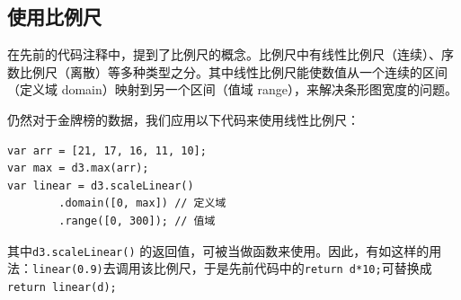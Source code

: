 \subsection{使用比例尺}

在先前的代码注释中，提到了比例尺的概念。比例尺中有线性比例尺（连续）、序数比例尺（离散）等多种类型之分。其中线性比例尺能使数值从一个连续的区间（定义域 domain）映射到另一个区间（值域 range），来解决条形图宽度的问题。

仍然对于金牌榜的数据，我们应用以下代码来使用线性比例尺：

\begin{verbatim}
var arr = [21, 17, 16, 11, 10];
var max = d3.max(arr);
var linear = d3.scaleLinear()
        .domain([0, max]) // 定义域
        .range([0, 300]); // 值域
\end{verbatim}

其中\verb|d3.scaleLinear()| 的返回值，可被当做函数来使用。因此，有如这样的用法：\verb|linear(0.9)|去调用该比例尺，于是先前代码中的\verb|return d*10;|可替换成\verb|return linear(d);|
